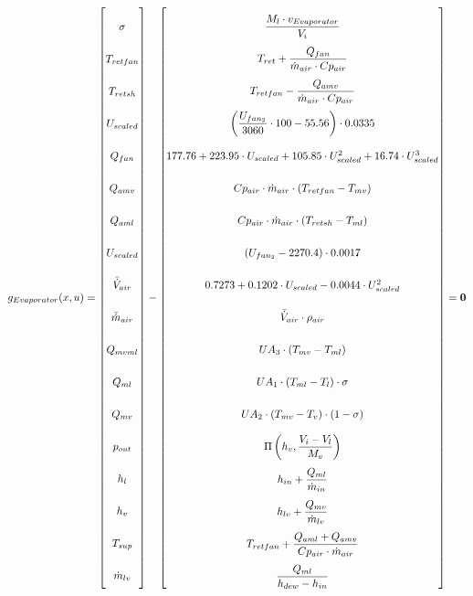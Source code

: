 \begin{equation} \label{eq:consump_x}\renewcommand{\arraystretch}{2.5}
	g_{Evaporator}(x,u) =  \begin{bmatrix}
		\sigma		\\
		T_{retfan}	\\
		T_{retsh}	\\
		U_{scaled}	\\
		Q_{fan}		\\
		Q_{amv}		\\
		Q_{aml}		\\
		U_{scaled}	\\
		\bar{\dot{V}}_{air}		\\
		\bar{\dot{m}}_{air}		\\
		Q_{mvml}	\\
		Q_{ml}		\\
		Q_{mv}		\\
		p_{out}		\\
		h_l			\\
		h_v 		\\
		T_{sup}		\\
		\dot{m}_{lv}\\
	\end{bmatrix}
	-
	\begin{bmatrix}
		\dfrac{M_l \cdot v_{Evaporator}}{V_i}							\\
		T_{ret} + \dfrac{Q_{fan}}{\dot{m}_{air} \cdot Cp_{air}}			\\
		T_{retfan} - \dfrac{Q_{amv}}{\dot{m}_{air} \cdot Cp_{air}}		\\
		\left( \dfrac{U_{fan_2}}{3060}\cdot 100 - 55.56 \right) \cdot 0.0335 \\
		177.76 + 223.95 \cdot U_{scaled} + 105.85 \cdot U_{scaled}^2 + 16.74 \cdot U_{scaled}^3 \\
		Cp_{air} \cdot \dot{m}_{air} \cdot (T_{retfan} - T_{mv}) 	 \\
		Cp_{air} \cdot \dot{m}_{air} \cdot (T_{retsh} - T_{ml}) \\
		(U_{fan_2} - 2270.4)\cdot 0.0017 \\
		0.7273 + 0.1202 \cdot U_{scaled}  -0.0044 \cdot U_{scaled}^2\\
		\bar{\dot{V}}_{air} \cdot \rho_{air}	\\
		U A_3 \cdot (T_{mv} - T_{ml})	\\
		U A_1 \cdot (T_{ml} - T_l) \cdot \sigma	\\
		U A_2 \cdot (T_{mv} - T_v) \cdot (1- \sigma)	\\
		\Pi \left( h_v, \dfrac{V_i-V_l}{M_v} \right)		\\
		h_{in} + \dfrac{Q_{ml}}{\dot{m}_{in}}			\\
		h_{lv} + \dfrac{Q_{mv}}{\dot{m}_{lv}}   		\\
		T_{retfan} +  \dfrac{Q_{aml} + Q_{amv}}{Cp_{air} \cdot \dot{m}_{air}} \\
		\dfrac{Q_{ml}}{h_{dew} - h_{in}}		\\
	\end{bmatrix}
	=\textbf{0}
\end{equation}



